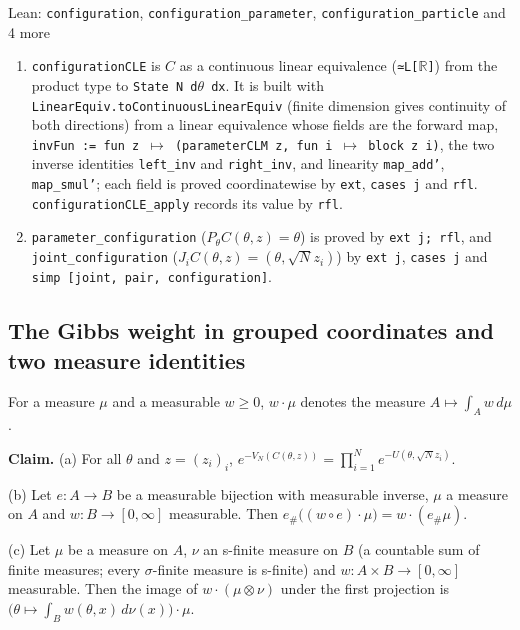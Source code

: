 \documentclass[11pt,a4paper]{report}
\begin{document}
\begin{leanbox}{Lean: \texttt{configuration}, \texttt{configuration\_\allowbreak{}parameter}, \texttt{configuration\_\allowbreak{}particle} and 4 more}
\begin{enumerate}
\item \texttt{configuration\allowbreak{}CLE} is \(C\) as a continuous linear equivalence (\texttt{≃L[\ensuremath{\mathbb R}]}) from the product type to \texttt{State N d\ensuremath{\theta} dx}. It is built with \texttt{Linear\allowbreak{}Equiv.\allowbreak{}to\allowbreak{}Continuous\allowbreak{}Linear\allowbreak{}Equiv} (finite dimension gives continuity of both directions) from a linear equivalence whose fields are the forward map, \texttt{inv\allowbreak{}Fun := fun z \ensuremath{\mapsto} (parameter\allowbreak{}CLM z, fun i \ensuremath{\mapsto} block z i)}, the two inverse identities \texttt{left\_\allowbreak{}inv} and \texttt{right\_\allowbreak{}inv}, and linearity \texttt{map\_\allowbreak{}add'}, \texttt{map\_\allowbreak{}smul'}; each field is proved coordinatewise by \texttt{ext}, \texttt{cases j} and \texttt{rfl}. \texttt{configuration\allowbreak{}CLE\_\allowbreak{}apply} records its value by \texttt{rfl}.

\item \texttt{parameter\_\allowbreak{}configuration} (\(P_\theta C(\theta,z)=\theta\)) is proved by \texttt{ext j; rfl}, and \texttt{joint\_\allowbreak{}configuration} (\(J_iC(\theta,z)=(\theta,\sqrt Nz_i)\)) by \texttt{ext j}, \texttt{cases j} and \texttt{simp [joint, pair, configuration]}.

\end{enumerate}
\end{leanbox}
\subsection{\texorpdfstring{The Gibbs weight in grouped coordinates and two measure identities}{The Gibbs weight in grouped coordinates and two measure identities}}
\label{report-step-IPLA-MarginalConcentration-lean-7}


For a measure \(\mu\) and a measurable \(w\ge0\), \(w\cdot\mu\) denotes the measure \(A\mapsto\int_Aw\,d\mu\).




\textbf{Claim.} (a) For all \(\theta\) and \(z=(z_i)_i\), \(e^{-V_N(C(\theta,z))}=\prod_{i=1}^Ne^{-U(\theta,\sqrt Nz_i)}\).




(b) Let \(e:A\to B\) be a measurable bijection with measurable inverse, \(\mu\) a measure on \(A\) and \(w:B\to[0,\infty]\) measurable. Then \(e_\#\bigl((w\circ e)\cdot\mu\bigr)=w\cdot(e_\#\mu)\).




(c) Let \(\mu\) be a measure on \(A\), \(\nu\) an s-finite measure on \(B\) (a countable sum of finite measures; every \(\sigma\)-finite measure is s-finite) and \(w:A\times B\to[0,\infty]\) measurable. Then the image of \(w\cdot(\mu\otimes\nu)\) under the first projection is \(\bigl(\theta\mapsto\int_Bw(\theta,x)\,d\nu(x)\bigr)\cdot\mu\).
\end{document}
